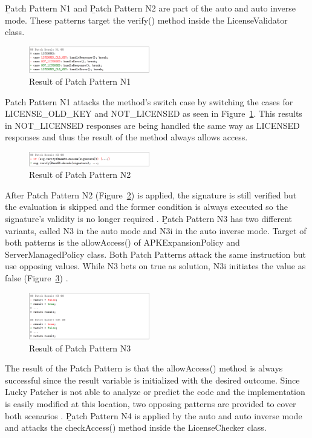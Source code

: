 \documentclass{sig-alternate}
\begin{document}
\b{Patch Pattern N1} and \b{Patch Pattern N2} are part of the auto and auto inverse mode.
These patterns target the verify() method inside the LicenseValidator class.
\begin{figure}[htbp]
  \centering
  \includegraphics[width=0.47\textwidth]{n1.png}
  \caption{Result of Patch Pattern N1 \cite{neutze}}
  \label{n1}
\end{figure}
Patch Pattern N1 attacks the method's switch case by switching the cases for LICENSE\_OLD\_KEY and NOT\_LICENSED as seen in Figure~\ref{n1}.
This results in NOT\_LICENSED responses are being handled the same way as LICENSED responses and thus the result of the method always allows access.
\begin{figure}[htbp]
  \centering
  \includegraphics[width=0.47\textwidth]{n2.png}
  \caption{Result of Patch Pattern N2 \cite{neutze}}
  \label{n2}
\end{figure}
After Patch Pattern N2 (Figure~\ref{n2}) is applied, the signature is still verified but the evaluation is skipped and the former condition is always executed so the signature's validity is no longer required \cite{neutze}. \b{Patch Pattern N3} has two different variants, called N3 in the auto mode and N3i in the auto inverse mode.
Target of both patterns is the allowAccess() of APKExpansionPolicy and ServerManagedPolicy class.
Both Patch Patterns attack the same instruction but use opposing values.
While N3 bets on true as solution, N3i initiates the value as false (Figure~\ref{n3}) .
\begin{figure}[htbp]
  \centering
  \includegraphics[width=0.47\textwidth]{n3.png}
  \caption{Result of Patch Pattern N3 \cite{neutze}}
  \label{n3}
\end{figure}
The result of the Patch Pattern is that the allowAccess() method is always successful since the result variable is initialized with the desired outcome. Since Lucky Patcher is not able to analyze or predict the code and the implementation is easily modified at this location, two opposing patterns are provided to cover both scenarios \cite{neutze}. \b{Patch Pattern N4} is applied by the auto and auto inverse mode and attacks the checkAccess() method inside the LicenseChecker class.
\end{document}
